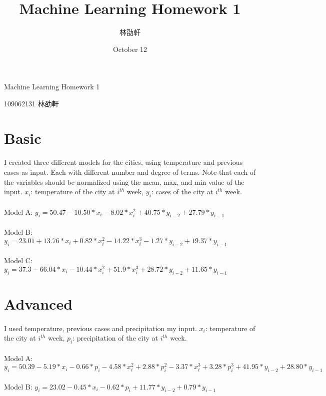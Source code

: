 \documentclass[12pt, a4paper, UTF8]{article}
\title{Machine Learning Homework 1}
\author{林劭軒}
\date{October 12}
\begin{document}
\begin{center} 
\Large Machine Learning Homework 1
\end{center} 
\begin{center} 
\small 109062131 林劭軒
\end{center} 
\section{Basic}
\paragraph {}
I created three different models for the cities, using temperature and previous cases as input. Each with different number and degree of terms. Note that each of the variables should be normalized using the mean, max, and min value of the input. $x_i$: temperature of the city at $i^{th}$ week, $y_i$: cases of the city at $i^{th}$ week.
\paragraph {}
Model A:
$y_i = 50.47 - 10.50*x_i - 8.02*x_i^2 + 40.75*y_{i-2} + 27.79*y_{i-1}$
\paragraph {}
Model B:
$y_i = 23.01 + 13.76*x_i + 0.82*x_i^2 -14.22*x_i^3 -1.27*y_{i-2} + 19.37*y_{i-1}$
\paragraph {}
Model C:
$y_i = 37.3 -66.04*x_i -10.44*x_i^2 + 51.9*x_i^3 + 28.72*y_{i-2} + 11.65*y_{i-1}$
\section{Advanced}
\paragraph {}
I used temperature, previous cases and precipitation my input. $x_i$: temperature of the city at $i^{th}$ week, $p_i$: precipitation of the city at $i^{th}$ week.
\paragraph {}
Model A:
$y_i = 50.39 -5.19*x_i -0.66*p_i -4.58*x_i^2 + 2.88*p_i^2 -3.37*x_i^3 + 3.28*p_i^3 + 41.95*y_{i-2} + 28.80*y_{i-1} $
\paragraph {}
Model B:
$y_i = 23.02 -0.45*x_i -0.62*p_i + 11.77*y_{i-2} + 0.79*y_{i-1} $
\end{document}
